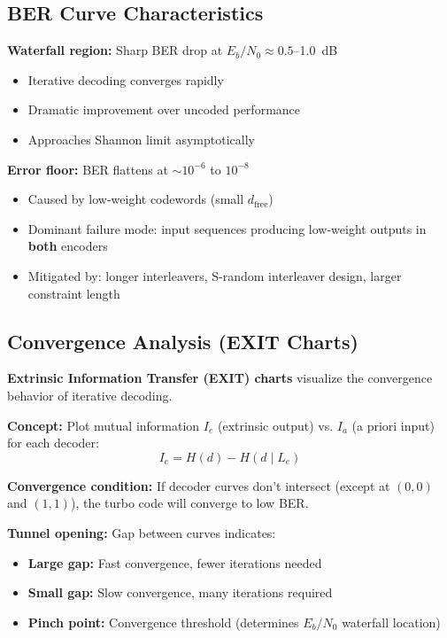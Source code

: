 \subsection{BER Curve Characteristics}

\textbf{Waterfall region:} Sharp BER drop at $E_b/N_0 \approx 0.5$--1.0~dB
\begin{itemize}
\item Iterative decoding converges rapidly
\item Dramatic improvement over uncoded performance
\item Approaches Shannon limit asymptotically
\end{itemize}

\textbf{Error floor:} BER flattens at $\sim 10^{-6}$ to $10^{-8}$
\begin{itemize}
\item Caused by low-weight codewords (small $d_{\text{free}}$)
\item Dominant failure mode: input sequences producing low-weight outputs in \textbf{both} encoders
\item Mitigated by: longer interleavers, S-random interleaver design, larger constraint length
\end{itemize}

\subsection{Convergence Analysis (EXIT Charts)}

\textbf{Extrinsic Information Transfer (EXIT) charts} visualize the convergence behavior of iterative decoding.

\textbf{Concept:} Plot mutual information $I_e$ (extrinsic output) vs. $I_a$ (a priori input) for each decoder:
\begin{equation}
I_e = H(d) - H(d \mid L_e)
\end{equation}

\textbf{Convergence condition:} If decoder curves don't intersect (except at $(0,0)$ and $(1,1)$), the turbo code will converge to low BER.

\textbf{Tunnel opening:} Gap between curves indicates:
\begin{itemize}
\item \textbf{Large gap:} Fast convergence, fewer iterations needed
\item \textbf{Small gap:} Slow convergence, many iterations required
\item \textbf{Pinch point:} Convergence threshold (determines $E_b/N_0$ waterfall location)
\end{itemize}

